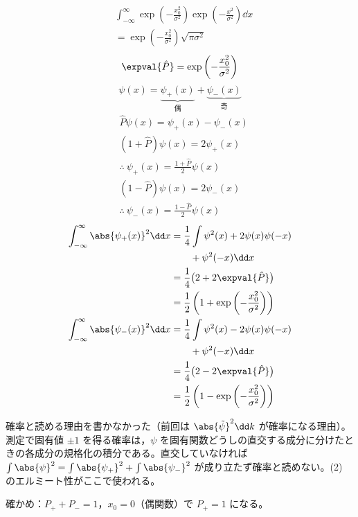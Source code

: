 \begin{align*}
&\int_{-\infty}^{\infty}\exp\left(-\frac{x_{0}^{2}}{\sigma^{2}}\right)\exp\left(-\frac{x^{2}}{\sigma^{2}}\right)\dd x\\
&=\exp\left(-\frac{x_{0}^{2}}{\sigma^{2}}\right)\sqrt{\pi\sigma^{2}}
\end{align*}
\[ \expval{\hat{P}}=\exp\left(-\frac{x_{0}^{2}}{\sigma^{2}}\right) \]
\[ \psi(x)=\underbrace{\psi_{+}(x)}_{\text{偶}}+\underbrace{\psi_{-}(x)}_{\text{奇}} \]
\begin{align*}
&\hat{P}\psi(x)=\psi_{+}(x)-\psi_{-}(x)\\
&(1+\hat{P})\psi(x)=2\psi_{+}(x)\\
&\therefore\ \psi_{+}(x)=\frac{1+\hat{P}}{2}\psi(x)\\
&(1-\hat{P})\psi(x)=2\psi_{-}(x)\\
&\therefore\ \psi_{-}(x)=\frac{1-\hat{P}}{2}\psi(x)
\end{align*}
\begin{align*}
\int_{-\infty}^{\infty}\abs{\psi_{+}(x)}^{2}\dd x&=\frac{1}{4}\int\psi^{2}(x)+2\psi(x)\psi(-x)\\
&\qquad+\psi^{2}(-x)\dd x\\
&=\frac{1}{4}\bigl(2+2\expval{\hat{P}}\bigr)\\
&=\frac{1}{2}\left(1+\exp\left(-\frac{x_{0}^{2}}{\sigma^{2}}\right)\right)\\
\int_{-\infty}^{\infty}\abs{\psi_{-}(x)}^{2}\dd x&=\frac{1}{4}\int\psi^{2}(x)-2\psi(x)\psi(-x)\\
&\qquad+\psi^{2}(-x)\dd x\\
&=\frac{1}{4}\bigl(2-2\expval{\hat{P}}\bigr)\\
&=\frac{1}{2}\left(1-\exp\left(-\frac{x_{0}^{2}}{\sigma^{2}}\right)\right)
\end{align*}
\item {} 確率と読める理由を書かなかった（前回は $\abs{\tilde{\psi}}^{2}\dd k$ が確率になる理由）。測定で固有値 $\pm1$ を得る確率は，$\psi$ を固有関数どうしの直交する成分に分けたときの各成分の規格化の積分である。直交していなければ $\int\abs{\psi}^{2}=\int\abs{\psi_{+}}^{2}+\int\abs{\psi_{-}}^{2}$ が成り立たず確率と読めない。(2) のエルミート性がここで使われる。
\item 確かめ：$P_{+}+P_{-}=1$，$x_{0}=0$（偶関数）で $P_{+}=1$ になる。
